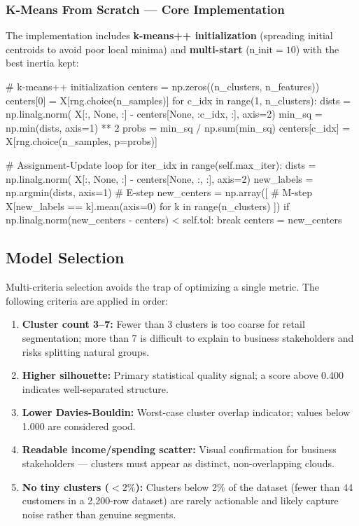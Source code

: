\subsubsection{K-Means From Scratch --- Core Implementation}

The implementation includes \textbf{k-means++ initialization} (spreading initial centroids to avoid poor local minima) and \textbf{multi-start} ($\text{n\_init}=10$) with the best inertia kept:

\begin{pythoncode}[caption={K-Means: k-means++ init + assignment-update loop}]
# k-means++ initialization
centers = np.zeros((n_clusters, n_features))
centers[0] = X[rng.choice(n_samples)]
for c_idx in range(1, n_clusters):
    dists = np.linalg.norm(
        X[:, None, :] - centers[None, :c_idx, :], axis=2)
    min_sq = np.min(dists, axis=1) ** 2
    probs = min_sq / np.sum(min_sq)
    centers[c_idx] = X[rng.choice(n_samples, p=probs)]

# Assignment-Update loop
for iter_idx in range(self.max_iter):
    dists = np.linalg.norm(
        X[:, None, :] - centers[None, :, :], axis=2)
    new_labels = np.argmin(dists, axis=1)        # E-step
    new_centers = np.array([                     # M-step
        X[new_labels == k].mean(axis=0)
        for k in range(n_clusters)
    ])
    if np.linalg.norm(new_centers - centers) < self.tol:
        break
    centers = new_centers
\end{pythoncode}

\subsection{Model Selection}

Multi-criteria selection avoids the trap of optimizing a single metric. The following criteria are applied in order:

\begin{enumerate}
  \item \textbf{Cluster count 3--7:} Fewer than 3 clusters is too coarse for retail segmentation; more than 7 is difficult to explain to business stakeholders and risks splitting natural groups.
  \item \textbf{Higher silhouette:} Primary statistical quality signal; a score above 0.400 indicates well-separated structure.
  \item \textbf{Lower Davies-Bouldin:} Worst-case cluster overlap indicator; values below 1.000 are considered good.
  \item \textbf{Readable income/spending scatter:} Visual confirmation for business stakeholders --- clusters must appear as distinct, non-overlapping clouds.
  \item \textbf{No tiny clusters ($<2\%$):} Clusters below 2\% of the dataset (fewer than 44 customers in a 2,200-row dataset) are rarely actionable and likely capture noise rather than genuine segments.
\end{enumerate}

